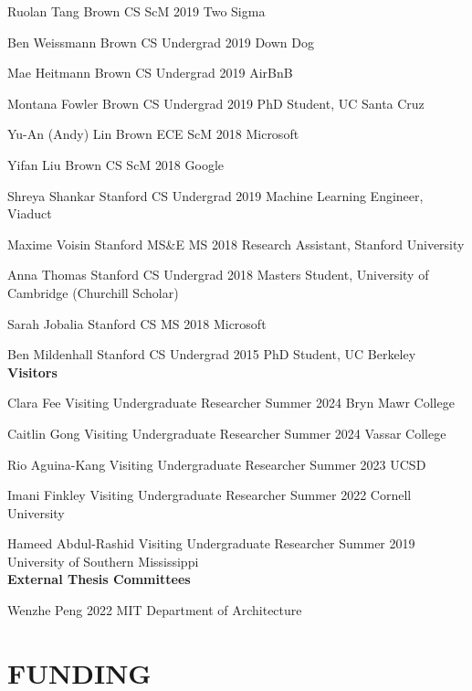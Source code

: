\documentclass[line,margin]{res}
\begin{document}
\begin{resume}
\alumni
{Ruolan Tang}
{Brown CS ScM}
{2019}
{Two Sigma}

\alumni
{Ben Weissmann}
{Brown CS Undergrad}
{2019}
{Down Dog}

\alumni
{Mae Heitmann}
{Brown CS Undergrad}
{2019}
{AirBnB}

\alumni
{Montana Fowler}
{Brown CS Undergrad}
{2019}
{PhD Student, UC Santa Cruz}

\alumni
{Yu-An (Andy) Lin}
{Brown ECE ScM}
{2018}
{Microsoft}

\alumni
{Yifan Liu}
{Brown CS ScM}
{2018}
{Google}

\alumni
{Shreya Shankar}
{Stanford CS Undergrad}
{2019}
{Machine Learning Engineer, Viaduct}

\alumni
{Maxime Voisin}
{Stanford MS\&E MS}
{2018}
{Research Assistant, Stanford University}

\alumni
{Anna Thomas}
{Stanford CS Undergrad}
{2018}
{Masters Student, University of Cambridge (Churchill Scholar)}

\alumni
{Sarah Jobalia}
{Stanford CS MS}
{2018}
{Microsoft}

\alumni
{Ben Mildenhall}
{Stanford CS Undergrad}
{2015}
{PhD Student, UC Berkeley}
\\


\textbf{Visitors}

\visitor
{Clara Fee}
{Visiting Undergraduate Researcher}
{Summer 2024}
{Bryn Mawr College}

\visitor
{Caitlin Gong}
{Visiting Undergraduate Researcher}
{Summer 2024}
{Vassar College}

\visitor
{Rio Aguina-Kang}
{Visiting Undergraduate Researcher}
{Summer 2023}
{UCSD}

\visitor
{Imani Finkley}
{Visiting Undergraduate Researcher}
{Summer 2022}
{Cornell University}

\visitor
{Hameed Abdul-Rashid}
{Visiting Undergraduate Researcher}
{Summer 2019}
{University of Southern Mississippi}
\\


\textbf{External Thesis Committees}

\thesiscomm
{Wenzhe Peng}
{2022}
{MIT Department of Architecture}


\section{FUNDING}


\end{resume}
\end{document}
